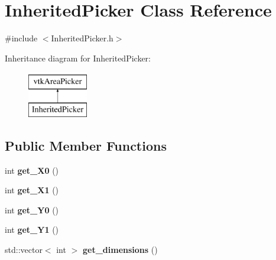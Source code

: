 \hypertarget{class_inherited_picker}{}\section{Inherited\+Picker Class Reference}
\label{class_inherited_picker}


{\ttfamily \#include $<$Inherited\+Picker.\+h$>$}

Inheritance diagram for Inherited\+Picker\+:\begin{figure}[H]
\begin{center}
\leavevmode
\includegraphics[height=2.000000cm]{class_inherited_picker}
\end{center}
\end{figure}
\subsection*{Public Member Functions}
\begin{DoxyCompactItemize}
\item 
int {\bfseries get\+\_\+\+X0} ()\hypertarget{class_inherited_picker_a43ed269bda4a7b27dc3f5fbb7c3da776}{}\label{class_inherited_picker_a43ed269bda4a7b27dc3f5fbb7c3da776}

\item 
int {\bfseries get\+\_\+\+X1} ()\hypertarget{class_inherited_picker_aed9b3615fc071c5c5e5a644e8e93bfc8}{}\label{class_inherited_picker_aed9b3615fc071c5c5e5a644e8e93bfc8}

\item 
int {\bfseries get\+\_\+\+Y0} ()\hypertarget{class_inherited_picker_a8c110b15b43d402965565b60bd8f327e}{}\label{class_inherited_picker_a8c110b15b43d402965565b60bd8f327e}

\item 
int {\bfseries get\+\_\+\+Y1} ()\hypertarget{class_inherited_picker_a9a37a7b8a9a0cbda4c636540706ae5df}{}\label{class_inherited_picker_a9a37a7b8a9a0cbda4c636540706ae5df}

\item 
std\+::vector$<$ int $>$ {\bfseries get\+\_\+dimensions} ()\hypertarget{class_inherited_picker_a01513df00a5a7677525f5c8ff6b15c68}{}\label{class_inherited_picker_a01513df00a5a7677525f5c8ff6b15c68}

\end{DoxyCompactItemize}


